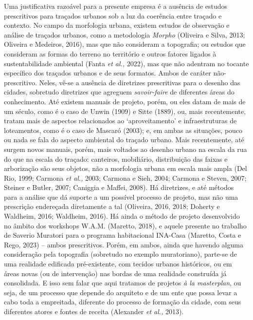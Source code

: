 \documentclass[12pt, a4paper]{book} %
\begin{document}
        Uma justificativa razoável para a presente empresa é a ausência de estudos prescritivos para traçados urbanos sob a luz da coerência entre traçado e contexto. No campo da morfologia urbana, existem estudos de observação e análise de traçados urbanos, como a metodologia \textit{Morpho} (Oliveira e Silva, 2013; Oliveira e Medeiros, 2016), mas que não consideram a topografia; ou estudos que consideram as formas do terreno no território e outros fatores ligados à sustentabilidade ambiental (Fanta \textit{et al.,} 2022), mas que não adentram no tocante específico dos traçados urbanos e de seus formatos. Ambos de caráter não-prescritivo. Neles, vê-se a ausência de diretrizes prescritivas para o desenho das cidades, sobretudo diretrizes que agreguem \textit{savoir-faire} de diferentes áreas do conhecimento. Até existem manuais de projeto, porém, ou eles datam de mais de um século, como é o caso de Unwin (1909) e Sitte (1889), ou, mais recentemente, tratam mais de aspectos relacionados ao `aproveitamento' e infraestruturas de loteamentos, como é o caso de Mascaró (2003); e, em ambas as situações, pouco ou nada se fala do aspecto ambiental do traçado urbano. Mais recentemente, até surgem novos manuais, porém, mais voltados ao desenho urbano na escala da rua do que na escala do traçado: canteiros, mobiliário, distribuição das faixas e arborização são seus objetos, não a morfologia urbana em escala mais ampla (Del Rio, 1999; Carmona \textit{et al.,} 2003; Carmona e Sieh, 2004; Carmona e Steven, 2007; Steiner e Butler, 2007; Caniggia e Maffei, 2008). Há diretrizes, e até métodos para a análise que dá suporte a um possível processo de projeto, mas não uma prescrição endereçada diretamente a tal (Oliveira, 2016, 2018; Doherty e Waldheim, 2016; Waldheim, 2016). Há ainda o método de projeto desenvolvido no âmbito dos workshops W.A.M. (Maretto, 2018), e aquele presente no trabalho de Saverio Muratori para o programa habitacional INA-Casa (Maretto, Costa e Rego, 2023) – ambos prescritivos. Porém, em ambos, ainda que havendo alguma consideração pela topografia (sobretudo no exemplo muratoriano), parte-se de uma realidade edificada pré-existente, com tecidos urbanos históricos, ou em áreas novas (ou de intervenção) nas bordas de uma realidade construída já consolidada. E isso sem falar que aqui tratamos de projetos \textit{à la masterplan}, ou seja, de um processo que depende do arquiteto e de um ente que possa levar a cabo toda a empreitada, diferente do processo de formação da cidade, com seus diferentes atores e fontes de receita (Alexander \textit{et al.,} 2013).
\end{document}
